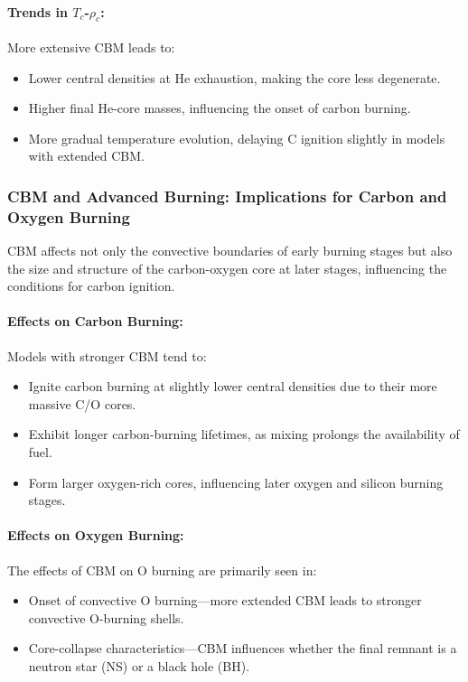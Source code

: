 \paragraph{Trends in $T_c$-$\rho_c$:}
More extensive CBM leads to:
\begin{itemize}
    \item Lower central densities at He exhaustion, making the core less degenerate.
    \item Higher final He-core masses, influencing the onset of carbon burning.
    \item More gradual temperature evolution, delaying C ignition slightly in models with extended CBM.
\end{itemize}

\subsubsection{CBM and Advanced Burning: Implications for Carbon and Oxygen Burning}

CBM affects not only the convective boundaries of early burning stages but also the size and structure of the carbon-oxygen core at later stages, influencing the conditions for carbon ignition.

\paragraph{Effects on Carbon Burning:}
Models with stronger CBM tend to:
\begin{itemize}
    \item Ignite carbon burning at slightly lower central densities due to their more massive C/O cores.
    \item Exhibit longer carbon-burning lifetimes, as mixing prolongs the availability of fuel.
    \item Form larger oxygen-rich cores, influencing later oxygen and silicon burning stages.
\end{itemize}

\paragraph{Effects on Oxygen Burning:}
The effects of CBM on O burning are primarily seen in:
\begin{itemize}
    \item Onset of convective O burning—more extended CBM leads to stronger convective O-burning shells.
    \item Core-collapse characteristics—CBM influences whether the final remnant is a neutron star (NS) or a black hole (BH).
\end{itemize}

